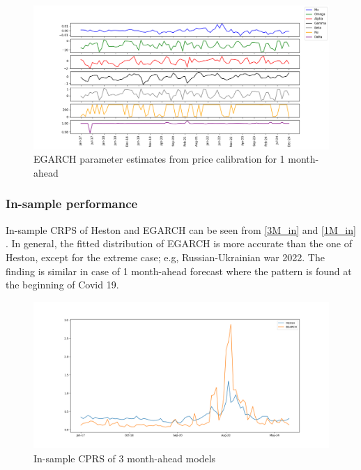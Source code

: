 \documentclass[12pt,a4paper]{article}
\newcommand\colorAutoref[1]{{\hypersetup{linkcolor=black}\autoref{#1}}}
\numberwithin{equation}{section}
\begin{document}
\begin{figure}[h!] 
\includegraphics[scale=1,width=1\linewidth,height=0.4\textheight]{egarch_params_1m.png}
\caption{EGARCH parameter estimates from price calibration for 1 month-ahead}
\label{1Megarchparams}
\end{figure}

\subsubsection{In-sample performance}


In-sample CRPS of Heston and EGARCH can be seen from \colorAutoref{3M_in} and \colorAutoref{1M_in} . In general, the fitted distribution of EGARCH is more accurate than the one of Heston, except for the extreme case; e.g, Russian-Ukrainian war 2022. The finding is similar in case of 1 month-ahead forecast where the pattern is found at the beginning of Covid 19. 

\begin{figure}[h!] 
\includegraphics[scale=1,width=1\linewidth,height=0.4\textheight]{insample_crps_3m.png}
\caption{In-sample CPRS of 3 month-ahead models}
\label{3M_in}
\end{figure}
\end{document}
